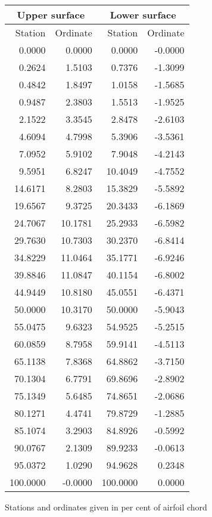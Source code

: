 \documentclass[11pt]{book}
\begin{document}
 \hspace{4mm}
 \begin{tabular}{|r|r|r|r|} \hline 
 \multicolumn{2}{|c|}{Upper surface} & \multicolumn{2}{|c|}{Lower surface} \\
 \hline
 Station & Ordinate & Station & Ordinate \\
 \hline
0.0000 & 0.0000 & 0.0000 & -0.0000 \\
0.2624 & 1.5103 & 0.7376 & -1.3099 \\
0.4842 & 1.8497 & 1.0158 & -1.5685 \\
0.9487 & 2.3803 & 1.5513 & -1.9525 \\
2.1522 & 3.3545 & 2.8478 & -2.6103 \\
4.6094 & 4.7998 & 5.3906 & -3.5361 \\
7.0952 & 5.9102 & 7.9048 & -4.2143 \\
9.5951 & 6.8247 & 10.4049 & -4.7552 \\
14.6171 & 8.2803 & 15.3829 & -5.5892 \\
19.6567 & 9.3725 & 20.3433 & -6.1869 \\
24.7067 & 10.1781 & 25.2933 & -6.5982 \\
29.7630 & 10.7303 & 30.2370 & -6.8414 \\
34.8229 & 11.0464 & 35.1771 & -6.9246 \\
39.8846 & 11.0847 & 40.1154 & -6.8002 \\
44.9449 & 10.8180 & 45.0551 & -6.4371 \\
50.0000 & 10.3170 & 50.0000 & -5.9043 \\
55.0475 & 9.6323 & 54.9525 & -5.2515 \\
60.0859 & 8.7958 & 59.9141 & -4.5113 \\
65.1138 & 7.8368 & 64.8862 & -3.7150 \\
70.1304 & 6.7791 & 69.8696 & -2.8902 \\
75.1349 & 5.6485 & 74.8651 & -2.0686 \\
80.1271 & 4.4741 & 79.8729 & -1.2885 \\
85.1074 & 3.2903 & 84.8926 & -0.5992 \\
90.0767 & 2.1309 & 89.9233 & -0.0613 \\
95.0372 & 1.0290 & 94.9628 & 0.2348 \\
100.0000 & -0.0000 & 100.0000 & 0.0000 \\
 \hline 
 \end{tabular}
 \vspace{8mm}

Stations and ordinates given in per cent of airfoil chord
\end{document}
